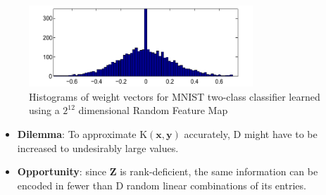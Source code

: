 \documentclass[xcolor=x11names,compress,ignorenonframetext,10pt]{beamer}
\renewcommand{\(}{\begin{columns}}
\renewcommand{\)}{\end{columns}}
\newcommand{\<}[1]{\begin{column}{#1}}
\renewcommand{\>}{\end{column}}
\begin{document}
\begin{frame}
\begin{figure}[b]
\centering
\includegraphics[width=0.75\textwidth]{figures/craftmaps/w1}
  \caption*{\small{Histograms of weight vectors for MNIST two-class classifier learned using a $2^{12}$ dimensional Random Feature Map}}
\label{fig:w1}
\end{figure}
\end{frame}


\begin{frame}
\begin{itemize}
\item \textbf{Dilemma}: To approximate $\textrm{K}(\mathbf{x},\mathbf{y})$ accurately, $\textrm{D}$ might have to be increased to undesirably large values.
\item \textbf{Opportunity}: since $\textbf{Z}$ is rank-deficient, the same information can be encoded in fewer than $\mathrm{D}$ random
    linear combinations of its entries.

\begin{center}
\end{center}
\end{itemize}
\end{frame}
\end{document}
